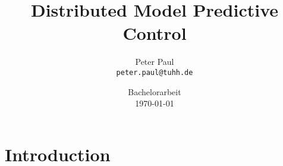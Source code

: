 





 \def\isenglish{true} 		%

\title{Distributed Model Predictive Control}

\author[P. Paul]{Peter Paul \texorpdfstring{\\}{} {\small\texttt{peter.paul@tuhh.de}}}


\date[\today]{Bachelorarbeit \\ \today}

\subject{Control Systems}



\begin{frame}
	\titlepage
\end{frame}

\part{Introduction}





